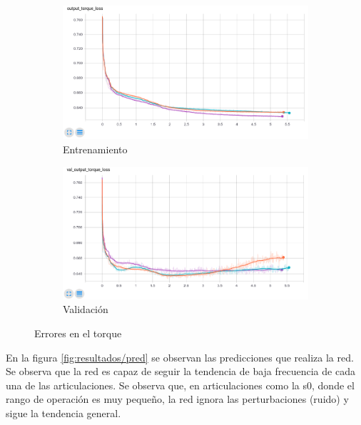 \begin{figure}
	\begin{subfigure}{0.45\textwidth}
		\centering
		\includegraphics[width=\linewidth]{imagenes/resultados/torque_final.png}
		\caption{Entrenamiento}
		\label{fig:resultados/torque_final}
	\end{subfigure}
	\begin{subfigure}{0.45\textwidth}
		\centering
		\includegraphics[width=\linewidth]{imagenes/resultados/val_torque_final.png}
		\caption{Validación}
		\label{fig:resultados/val_torque_final}
	\end{subfigure}
	\caption{Errores en el torque}
	\label{fig:resultados/final}
\end{figure}

En la figura \ref{fig:resultados/pred} se observan las predicciones que realiza la red. Se observa que la red es capaz de seguir la tendencia de baja frecuencia de cada una de las articulaciones. Se observa que, en articulaciones como la s0, donde el rango de operación es muy pequeño, la red ignora las perturbaciones (ruido) y sigue la tendencia general.

